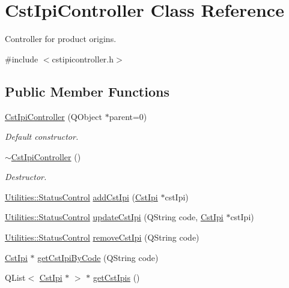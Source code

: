 \hypertarget{class_cst_ipi_controller}{\section{\-Cst\-Ipi\-Controller \-Class \-Reference}
\label{class_cst_ipi_controller}
}


\-Controller for product origins.  




{\ttfamily \#include $<$cstipicontroller.\-h$>$}

\subsection*{\-Public \-Member \-Functions}
\begin{DoxyCompactItemize}
\item 
\hyperlink{class_cst_ipi_controller_a49b99024d63b57f36c17089fe890bd93}{\-Cst\-Ipi\-Controller} (\-Q\-Object $\ast$parent=0)
\begin{DoxyCompactList}\small\item\em \-Default constructor. \end{DoxyCompactList}\item 
\hyperlink{class_cst_ipi_controller_a0d5a2a52c9d0e6c5059f1705774f7dd8}{$\sim$\-Cst\-Ipi\-Controller} ()
\begin{DoxyCompactList}\small\item\em \-Destructor. \end{DoxyCompactList}\item 
\hyperlink{class_utilities_a2974f062d85bdb0c444a1cbe554bf228}{\-Utilities\-::\-Status\-Control} \hyperlink{class_cst_ipi_controller_a3cdea1d587382201466e650bcfd3a6df}{add\-Cst\-Ipi} (\hyperlink{class_cst_ipi}{\-Cst\-Ipi} $\ast$cst\-Ipi)
\item 
\hyperlink{class_utilities_a2974f062d85bdb0c444a1cbe554bf228}{\-Utilities\-::\-Status\-Control} \hyperlink{class_cst_ipi_controller_af6e321228c9d8e31959d96f666830890}{update\-Cst\-Ipi} (\-Q\-String code, \hyperlink{class_cst_ipi}{\-Cst\-Ipi} $\ast$cst\-Ipi)
\item 
\hyperlink{class_utilities_a2974f062d85bdb0c444a1cbe554bf228}{\-Utilities\-::\-Status\-Control} \hyperlink{class_cst_ipi_controller_ae5aae4c40b714fcbdc5c888b715aa97b}{remove\-Cst\-Ipi} (\-Q\-String code)
\item 
\hyperlink{class_cst_ipi}{\-Cst\-Ipi} $\ast$ \hyperlink{class_cst_ipi_controller_a9f3b2e207f4ff2b853eb78e1ec5ddcec}{get\-Cst\-Ipi\-By\-Code} (\-Q\-String code)
\item 
\-Q\-List$<$ \hyperlink{class_cst_ipi}{\-Cst\-Ipi} $\ast$ $>$ $\ast$ \hyperlink{class_cst_ipi_controller_a6eefc6ed60bc98c119b2b126ebf1af92}{get\-Cst\-Ipis} ()
\end{DoxyCompactItemize}


